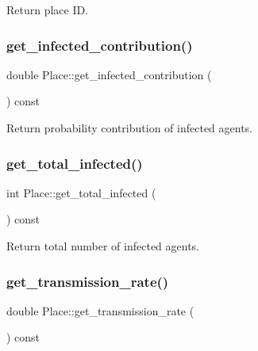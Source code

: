Return place ID. 

\mbox{\label{classPlace_a8a3cc52898c24655efc92f51512a81ce}} 
\subsubsection{\texorpdfstring{get\+\_\+infected\+\_\+contribution()}{get\_infected\_contribution()}}
{\footnotesize\ttfamily double Place\+::get\+\_\+infected\+\_\+contribution (\begin{DoxyParamCaption}{ }\end{DoxyParamCaption}) const\hspace{0.3cm}{\ttfamily [inline]}}



Return probability contribution of infected agents. 

\mbox{\label{classPlace_a0f1e45a13137205dd65f6e33a0a110a6}} 
\subsubsection{\texorpdfstring{get\+\_\+total\+\_\+infected()}{get\_total\_infected()}}
{\footnotesize\ttfamily int Place\+::get\+\_\+total\+\_\+infected (\begin{DoxyParamCaption}{ }\end{DoxyParamCaption}) const\hspace{0.3cm}{\ttfamily [inline]}}



Return total number of infected agents. 

\mbox{\label{classPlace_a024b5b993c0f566135090a4c3336c24c}} 
\subsubsection{\texorpdfstring{get\+\_\+transmission\+\_\+rate()}{get\_transmission\_rate()}}
{\footnotesize\ttfamily double Place\+::get\+\_\+transmission\+\_\+rate (\begin{DoxyParamCaption}{ }\end{DoxyParamCaption}) const\hspace{0.3cm}{\ttfamily [inline]}}



